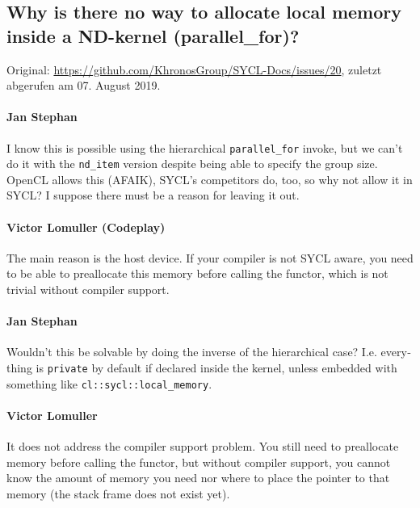\subsection{Why is there no way to allocate local memory inside a ND-kernel
            (parallel\_for)?}\label{anhang:diskussionen:syclspec:staticshared}

Original: \url{https://github.com/KhronosGroup/SYCL-Docs/issues/20}, zuletzt
abgerufen am 07. August 2019.

\begin{otherlanguage}{english}
    \paragraph{Jan Stephan} I know this is possible using the hierarchical
                            \texttt{parallel\_for} invoke, but we can't do it
                            with the \texttt{nd\_item} version despite being
                            able to specify the group size. OpenCL allows this
                            (AFAIK), SYCL's competitors do, too, so why not
                            allow it in SYCL? I suppose there must be a reason
                            for leaving it out.
    \paragraph{Victor Lomuller (Codeplay)} The main reason is the host device.
                            If your compiler is not SYCL aware, you need to be
                            able to preallocate this memory before calling the
                            functor, which is not trivial without compiler
                            support.
    \paragraph{Jan Stephan} Wouldn't this be solvable by doing the inverse of
                            the hierarchical case? I.e. everything is
                            \texttt{private} by default if declared inside the
                            kernel, unless embedded with something like
                            \texttt{cl::sycl::local\_memory}.
    \paragraph{Victor Lomuller} It does not address the compiler support
                                problem. You still need to preallocate memory
                                before calling the functor, but without compiler
                                support, you cannot know the amount of memory
                                you need nor where to place the pointer to that
                                memory (the stack frame does not exist yet).

\end{otherlanguage}
